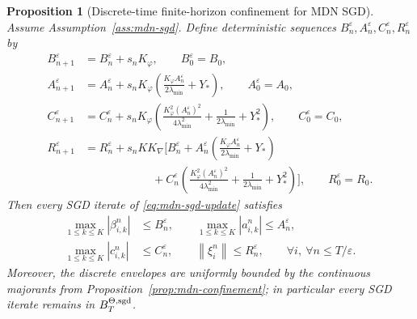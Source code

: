 \documentclass[11pt]{article}
\newtheorem{proposition}[theorem]{Proposition}
\theoremstyle{definition}
\newcommand{\norm}[1]{\left\lVert #1 \right\rVert}
\begin{document}
\begin{proposition}[Discrete-time finite-horizon confinement for MDN SGD]
\label{prop:mdn-sgd-discrete-confinement}
Assume Assumption~\ref{ass:mdn-sgd}. Define deterministic sequences
$B_n^\varepsilon,A_n^\varepsilon,C_n^\varepsilon,R_n^\varepsilon$ by
\begin{align}
  B_{n+1}^\varepsilon
  &=
  B_n^\varepsilon + s_n K_\varphi,
  \qquad
  B_0^\varepsilon=B_0,
  \label{eq:mdn-discrete-B-envelope}
  \\
  A_{n+1}^\varepsilon
  &=
  A_n^\varepsilon
  +
  s_n K_\varphi
  \left(
    \frac{K_\varphi A_n^\varepsilon}{2\lambda_{\min}}+Y_\ast
  \right),
  \qquad
  A_0^\varepsilon=A_0,
  \label{eq:mdn-discrete-A-envelope}
  \\
  C_{n+1}^\varepsilon
  &=
  C_n^\varepsilon
  +
  s_n K_\varphi
  \left(
    \frac{K_\varphi^2 (A_n^\varepsilon)^2}{4\lambda_{\min}^2}
    +
    \frac{1}{2\lambda_{\min}}
    +
    Y_\ast^2
  \right),
  \qquad
  C_0^\varepsilon=C_0,
  \label{eq:mdn-discrete-C-envelope}
  \\
  R_{n+1}^\varepsilon
  &=
  R_n^\varepsilon
  +
  s_n K K_\nabla
  \Biggl[
    B_n^\varepsilon
    +
    A_n^\varepsilon
    \left(
      \frac{K_\varphi A_n^\varepsilon}{2\lambda_{\min}}+Y_\ast
    \right)
    \nonumber\\
  &\qquad\qquad\qquad
    +
    C_n^\varepsilon
    \left(
      \frac{K_\varphi^2 (A_n^\varepsilon)^2}{4\lambda_{\min}^2}
      +
      \frac{1}{2\lambda_{\min}}
      +
      Y_\ast^2
    \right)
  \Biggr],
  \qquad
  R_0^\varepsilon=R_0.
  \label{eq:mdn-discrete-R-envelope}
\end{align}
Then every SGD iterate of \eqref{eq:mdn-sgd-update} satisfies
\[
  \begin{aligned}
    \max_{1\le k\le K}|\beta_{i,k}^n|&\le B_n^\varepsilon,
    \qquad
    \max_{1\le k\le K}|a_{i,k}^n|\le A_n^\varepsilon,
    \\
    \max_{1\le k\le K}|c_{i,k}^n|&\le C_n^\varepsilon,
    \qquad
    \norm{\xi_i^n}\le R_n^\varepsilon,
    \qquad
    \forall i,\ \forall n\le T/\varepsilon.
  \end{aligned}
\]
Moreover, the discrete envelopes are uniformly bounded by the continuous
majorants from Proposition~\ref{prop:mdn-confinement}; in particular every SGD
iterate remains in $B_T^{\Theta,\rm sgd}$.
\end{proposition}
\end{document}
